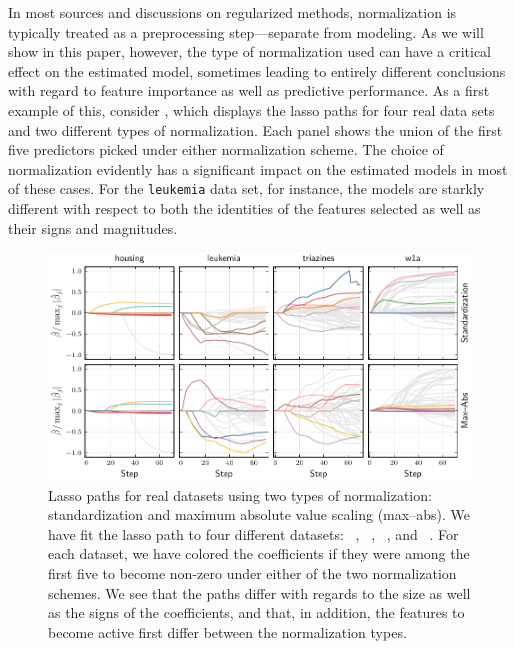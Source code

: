 In most sources and discussions on regularized methods, normalization is typically treated
as a preprocessing step---separate from modeling. As we will show in this paper, however,
the type of normalization used can have a critical effect on the estimated model, sometimes
leading to entirely different conclusions with regard to feature importance as well as
predictive performance. As a first example of this, consider ,
which displays the lasso paths for four real data sets and two different types of
normalization. Each panel shows the union of the first five predictors picked under either
normalization scheme. The choice of normalization evidently has a significant impact on the
estimated models in most of these cases. For the \texttt{leukemia} data set, for instance,
the models are starkly different with respect to both the identities of the features
selected as well as their signs and magnitudes.

\begin{figure}[bpt]
  \centering
  \includegraphics[]{plots/realdata_paths.pdf}
  \caption{%
    Lasso paths for real datasets using two types of normalization: standardization and maximum absolute value scaling (max--abs). We have fit the lasso path to four different datasets: ~\citep{harrison1978}, ~\citep{golub1999}, ~\citep{king}, and ~\citep{platt1998}. For each dataset, we have colored the coefficients if they were among the first five to become non-zero under either of the two normalization schemes. We see that the paths differ with regards to the size as well as the signs of the coefficients, and that, in addition, the features to become active first differ between the normalization types.
  }
  \label{fig:realdata-paths}
\end{figure}

